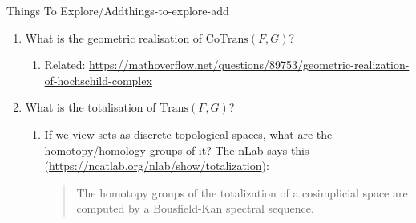 \begin{remark}{Things To Explore/Add}{things-to-explore-add}
\begin{enumerate}
\begin{enumerate}
\begin{enumerate}
                    \end{enumerate}
                \item What is the geometric realisation of $\mathrm{CoTrans}(F,G)$?
                    \begin{enumerate}
                        \item Related: \url{https://mathoverflow.net/questions/89753/geometric-realization-of-hochschild-complex}
                    \end{enumerate}
                \item What is the totalisation of $\mathrm{Trans}(F,G)$?
                    \begin{enumerate}
                        \item If we view sets as discrete topological spaces, what are the homotopy/homology groups of it? The nLab says this (\url{https://ncatlab.org/nlab/show/totalization}):
                            \begin{quote}
                                The homotopy groups of the totalization of a cosimplicial space are computed by a Bousfield-Kan spectral sequence.


\end{quote}
\end{enumerate}
\end{enumerate}
\end{enumerate}
\end{remark}
